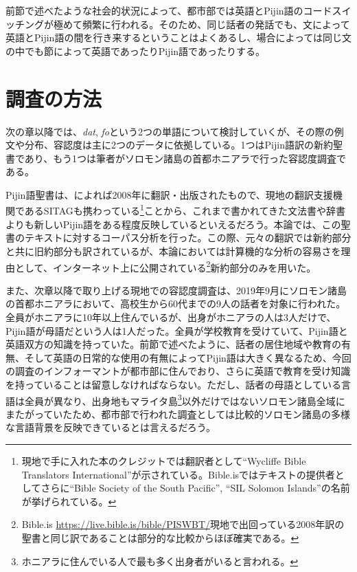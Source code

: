 前節で述べたような社会的状況によって、都市部では英語とPijin語のコードスイッチングが極めて頻繁に行われる。そのため、同じ話者の発話でも、文によって英語とPijin語の間を行き来するということはよくあるし、場合によっては同じ文の中でも節によって英語であったりPijin語であったりする。

\section{調査の方法}\label{sec:howexamined}
次の章以降では、\textit{dat}, \textit{fo}という2つの単語について検討していくが、その際の例文や分布、容認度は主に2つのデータに依拠している。1つはPijin語訳の新約聖書であり、もう1つは筆者がソロモン諸島の首都ホニアラで行った容認度調査である。

Pijin語聖書は、\cite{solomontimes}によれば2008年に翻訳・出版されたもので、現地の翻訳支援機関であるSITAGも携わっている\footnote{現地で手に入れた本のクレジットでは翻訳者として``Wycliffe Bible Translators International''が示されている。Bible.isではテキストの提供者としてさらに``Bible Society of the South Pacific'', ``SIL Solomon Islands''の名前が挙げられている。}ことから、これまで書かれてきた文法書や辞書よりも新しいPijin語をある程度反映しているといえるだろう。本論では、この聖書のテキストに対するコーパス分析を行った。この際、元々の翻訳では新約部分と共に旧約部分も訳されているが、本論においては計算機的な分析の容易さを理由として、インターネット上に公開されている\footnote{Bible.is \url{https://live.bible.is/bible/PISWBT/}現地で出回っている2008年訳の聖書と同じ訳であることは部分的な比較からほぼ確実である。}新約部分のみを用いた。

また、次章以降で取り上げる現地での容認度調査は、2019年9月にソロモン諸島の首都ホニアラにおいて、高校生から60代までの9人の話者を対象に行われた。全員がホニアラに10年以上住んでいるが、出身がホニアラの人は3人だけで、Pijin語が母語だという人は1人だった。全員が学校教育を受けていて、Pijin語と英語双方の知識を持っていた。前節で述べたように、話者の居住地域や教育の有無、そして英語の日常的な使用の有無によってPijin語は大きく異なるため、今回の調査のインフォーマントが都市部に住んでおり、さらに英語で教育を受け知識を持っていることは留意しなければならない。ただし、話者の母語としている言語は全員が異なり、出身地もマライタ島\footnote{ホニアラに住んでいる人で最も多く出身者がいると言われる。}以外だけではないソロモン諸島全域にまたがっていたため、都市部で行われた調査としては比較的ソロモン諸島の多様な言語背景を反映できているとは言えるだろう。
